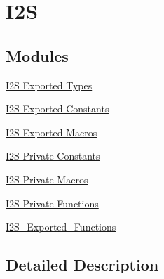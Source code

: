 \hypertarget{group___i2_s}{}\section{I2S}
\label{group___i2_s}
\subsection*{Modules}
\begin{DoxyCompactItemize}
\item 
\hyperlink{group___i2_s___exported___types}{I2\+S Exported Types}
\item 
\hyperlink{group___i2_s___exported___constants}{I2\+S Exported Constants}
\item 
\hyperlink{group___i2_s___exported___macros}{I2\+S Exported Macros}
\item 
\hyperlink{group___i2_s___private___constants}{I2\+S Private Constants}
\item 
\hyperlink{group___i2_s___private___macros}{I2\+S Private Macros}
\item 
\hyperlink{group___i2_s___private___functions}{I2\+S Private Functions}
\item 
\hyperlink{group___i2_s___exported___functions}{I2\+S\+\_\+\+Exported\+\_\+\+Functions}
\end{DoxyCompactItemize}


\subsection{Detailed Description}
